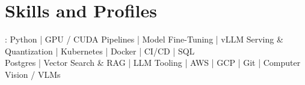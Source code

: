 \documentclass[]{jack-resume}
\begin{document}
\pagecolor{darkmodeBackground}

%
%



%
%
\begin{minipage}[t][1cm][t]{.03\textwidth}
    \hfill
\end{minipage}






\section{Skills and Profiles}
:
Python \hfill | \hfill
GPU / CUDA Pipelines \hfill | \hfill
Model Fine-Tuning \hfill | \hfill
vLLM Serving \& Quantization \hfill | \hfill
Kubernetes \hfill | \hfill
Docker \hfill | \hfill
CI/CD \hfill | \hfill
SQL \\
\hspace{1.0cm} Postgres \hfill | \hfill
Vector Search \& RAG \hfill | \hfill
LLM Tooling \hfill | \hfill
AWS \hfill | \hfill
GCP \hfill | \hfill
Git \hfill | \hfill
Computer Vision / VLMs \\
\end{document}
